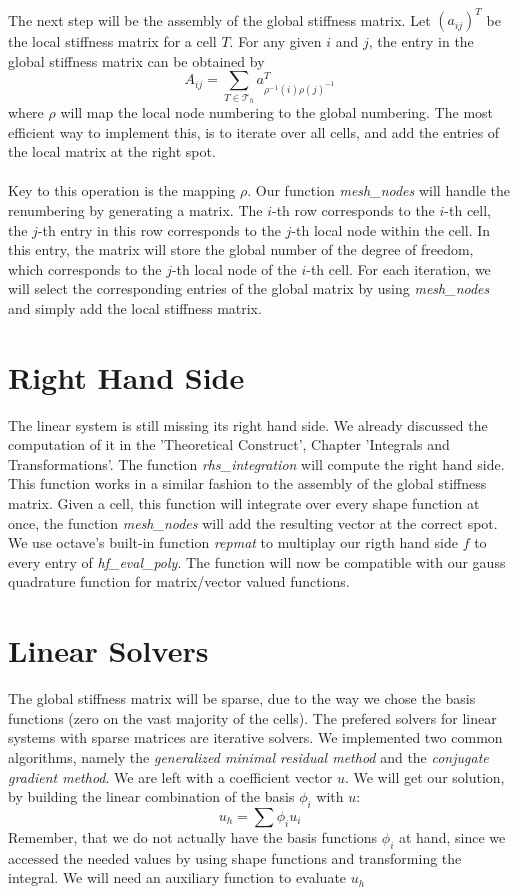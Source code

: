 \documentclass[a4paper,12pt]{article}
\begin{document}
\\
The next step will be the assembly of the global stiffness matrix.
Let $(a_{ij})^T$ be the local stiffness matrix for a cell $T$. For any given $i$ and $j$, the entry in the global stiffness matrix can be obtained by \[A_{ij}=\sum_{T \in \mathscr{T}_h}a_{\rho^{-1}(i)\rho(j)^{-1}}^T\] where $\rho$ will map the local node numbering to the global numbering. The most efficient way to implement this, is to iterate over all cells, and add the entries of the local matrix at the right spot.\\
\\
Key to this operation is the mapping $\rho$. Our function \textit{mesh\_nodes} will handle the renumbering by generating a matrix. The $i$-th row corresponds to the $i$-th cell, the $j$-th entry in this row corresponds to the $j$-th local node within the cell. In this entry, the matrix will store the global number of the degree of freedom, which corresponds to the $j$-th local node of the $i$-th cell. For each iteration, we will select the corresponding entries of the global matrix by using \textit{mesh\_nodes} and simply add the local stiffness matrix.

\section{Right Hand Side}
The linear system is still missing its right hand side. We already discussed the computation of it in the 'Theoretical Construct', Chapter 'Integrals and Transformations'. The function \textit{rhs\_integration} will compute the right hand side. \\
This function works in a similar fashion to the assembly of the global stiffness matrix. Given a cell, this function will integrate over every shape function at once, the function \textit{mesh\_nodes} will add the resulting vector at the correct spot. We use octave's built-in function \textit{repmat} to multiplay our rigth hand side $f$ to every entry of \textit{hf\_eval\_poly}. The function will now be compatible with our gauss quadrature function for matrix/vector valued functions.

\section{Linear Solvers}
The global stiffness matrix will be sparse, due to the way we chose the basis functions (zero on the vast majority of the cells). The prefered solvers for linear systems with sparse matrices are iterative solvers. We implemented two common algorithms, namely the \textit{generalized minimal residual method} and the \textit{conjugate gradient method}. 
We are left with a coefficient vector $u$. We will get our solution, by building the linear combination of the basis ${\phi_i}$ with $u$: 
\[u_h = \sum \phi_i u_i\]
Remember, that we do not actually have the basis functions $\phi_i$ at hand, since we accessed the needed values by using shape functions and transforming the integral. We will need an auxiliary function to evaluate $u_h$
\end{document}
